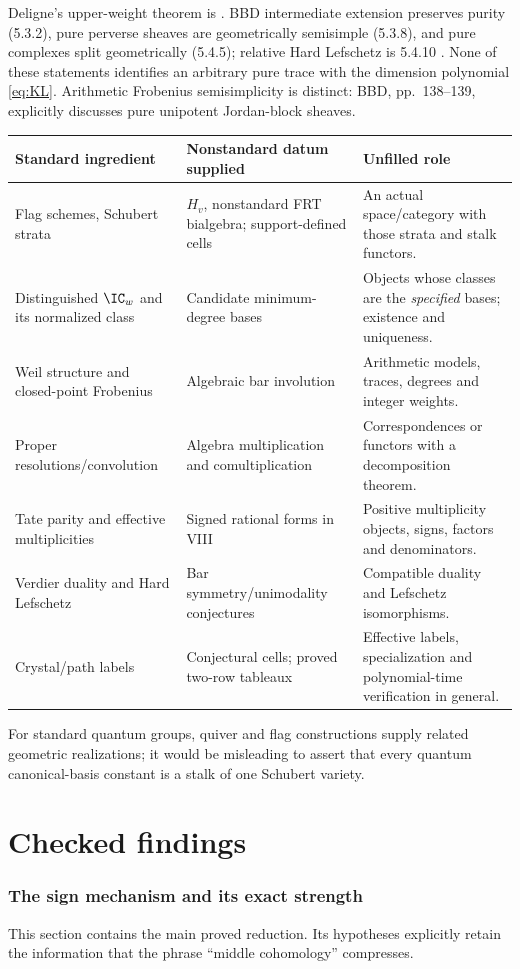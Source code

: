 \documentclass[11pt,a4paper]{article}
\theoremstyle{named}\newtheorem{finding}{Finding}[section]
\theoremstyle{definition}\newtheorem{definition}[finding]{Definition}
\theoremstyle{remark}\newtheorem{remark}[finding]{Remark}
\begin{document}
Deligne's upper-weight theorem is \cite[Theorem 3.3.1; Corollaries 3.3.4--3.3.6]{WeilII}. BBD intermediate extension preserves purity (5.3.2), pure perverse sheaves are geometrically semisimple (5.3.8), and pure complexes split geometrically (5.4.5); relative Hard Lefschetz is 5.4.10 \cite{BBD}. None of these statements identifies an arbitrary pure trace with the dimension polynomial \eqref{eq:KL}. Arithmetic Frobenius semisimplicity is distinct: BBD, pp.~138--139, explicitly discusses pure unipotent Jordan-block sheaves.

{\small\begin{longtable}{p{.25\linewidth}p{.29\linewidth}p{.38\linewidth}}
\toprule Standard ingredient&Nonstandard datum supplied&Unfilled role\\\midrule\endhead
Flag schemes, Schubert strata&$H_v$, nonstandard FRT bialgebra; support-defined cells&An actual space/category with those strata and stalk functors.\\
Distinguished $\IC_w$ and its normalized class&Candidate minimum-degree bases&Objects whose classes are the \emph{specified} bases; existence and uniqueness.\\
Weil structure and closed-point Frobenius&Algebraic bar involution&Arithmetic models, traces, degrees and integer weights.\\
Proper resolutions/convolution&Algebra multiplication and comultiplication&Correspondences or functors with a decomposition theorem.\\
Tate parity and effective multiplicities&Signed rational forms in VIII&Positive multiplicity objects, signs, factors and denominators.\\
Verdier duality and Hard Lefschetz&Bar symmetry/unimodality conjectures&Compatible duality and Lefschetz isomorphisms.\\
Crystal/path labels&Conjectural cells; proved two-row tableaux&Effective labels, specialization and polynomial-time verification in general.\\\bottomrule
\end{longtable}}
For standard quantum groups, quiver and flag constructions supply related geometric realizations; it would be misleading to assert that every quantum canonical-basis constant is a stalk of one Schubert variety.

\part{Checked findings}
\section{The sign mechanism and its exact strength}\label{sec:main}
This section contains the main proved reduction. Its hypotheses explicitly retain the information that the phrase ``middle cohomology'' compresses.
\end{document}
